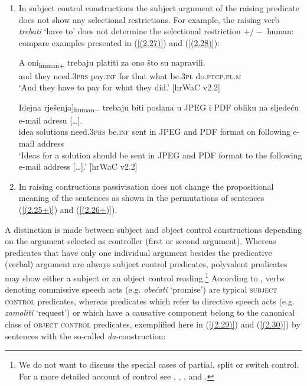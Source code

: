 \begin{enumerate}
\item In subject control constructions the subject argument of the raising predicate does not show any selectional restrictions. For example, the raising verb \textit{trebati} `have to' does not determine the selectional restriction $+/-$ human: compare examples presented in (\ref{(2.27)}) and (\ref{(2.28)}):

\begin{exe}\ex\label{(2.27)}
\gll A  oni\textsubscript{human$+$} trebaju platiti za ono što su napravili.  \\
 and they need\textsc{.3prs} pay\textsc{.inf} for that what be\textsc{.3pl} do\textsc{.ptcp.pl.m}  \\
\glt ‘And they have to pay for what they did.’ 
\hfill [hrWaC v2.2]

\ex\label{(2.28)}
\gll \minsp{[} Idejna rješenja]\textsubscript{human$-$} trebaju biti poslana u JPEG i PDF obliku na sljedeću e-mail adresu [\dots].  \\
 {} idea solutions need\textsc{.3prs} be\textsc{.inf} sent in JPEG and PDF format on following e-mail address  \\
\glt ‘Ideas for a solution should be sent in JPEG and PDF format to the following e-mail address [\dots].’ 
\hfill [hrWaC v2.2]
\end{exe}

\item In raising contructions passivisation does not change the propositional meaning of the sentences as shown in the permutations of sentences (\ref{(2.25+)}) and (\ref{(2.26+)}).
\end{enumerate}

\begin{sloppypar}
A distinction is made between subject and object control constructions depending on the argument selected as controller (first or second argument). Whereas predicates that have only one individual argument besides the predicative (verbal) argument are always subject control predicates, polyvalent predicates may show either a subject or an object control reading.\footnote{We do not want to discuss the special cases of partial, split or switch control. For a more detailed account of control see \citet{Stiebels07, Stiebels15}, \citet{Landau00}, \citet{Moskovljevic07}, and \citet{Slodowicz08}.} According to \citet[422]{Stiebels15}, verbs denoting commissive speech acts (e.g. \textit{obećati} `promise') are typical \textsc{subject} \textsc{control} predicates, whereas predicates which refer to directive speech acts (e.g. \textit{zamoliti} `request') or which have a causative component belong to the canonical class of \textsc{object} \textsc{control} predicates, exemplified here in (\ref{(2.29)}) and (\ref{(2.30)}) by sentences with the so-called \textit{da}-construction:
\end{sloppypar}

